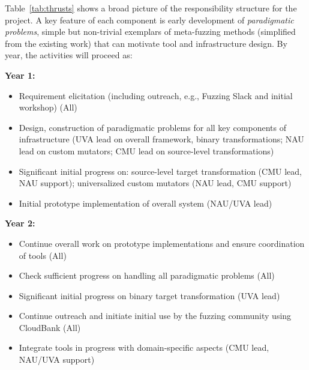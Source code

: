 Table~\ref{tab:thrusts} shows a broad picture of the responsibility structure for the project.  A key feature of each component is early
development of \emph{paradigmatic problems},  simple but
non-trivial exemplars of meta-fuzzing methods (simplified from the
existing work) that can motivate tool and infrastructure
design.  By year, the activities will proceed as:

\noindent\textbf{Year 1:} 
 \begin{itemize}[labelwidth=0.7em, labelsep=0.6em, topsep=0ex, itemsep=0ex,
  parsep=0ex, leftmargin=1.5em]
  \item Requirement elicitation (including outreach, e.g.,
    Fuzzing Slack and initial workshop) (All)
  \item Design, construction of paradigmatic problems for all key components of
  infrastructure (UVA lead on overall framework, binary transformations; NAU lead on custom mutators; CMU lead on source-level transformations)
  \item Significant initial progress on: source-level target transformation (CMU lead,
    NAU support); universalized custom mutators (NAU lead,
  CMU support)
  \item Initial prototype implementation of overall system (NAU/UVA lead)
\end{itemize}

\noindent\textbf{Year 2:}
\begin{itemize}[labelwidth=0.7em, labelsep=0.6em, topsep=0ex, itemsep=0ex,
  parsep=0ex, leftmargin=1.5em]
\item Continue overall work on prototype implementations and ensure
  coordination of tools (All)
  \item Check sufficient progress on handling all paradigmatic
    problems (All)
 \item Significant initial progress on binary target transformation (UVA lead)
  \item Continue outreach and initiate initial use by the fuzzing community using CloudBank (All)
    \item Integrate tools in progress with 
      domain-specific aspects (CMU lead, NAU/UVA support)
\end{itemize}


